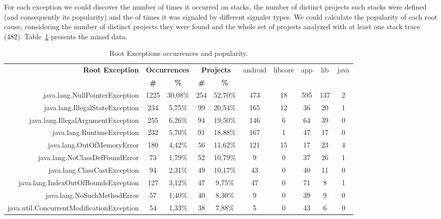 \documentclass[conference]{IEEEtran}
\begin{document}
For each exception we could discover the number of times it occurred on stacks,
the number of distinct projects such stacks were defined (and consequently its
popularity) and the of times it was signaled by different signaler types. We
could calculate the popularity of each root cause, considering the number of
distinct projects they were found and the whole set of projects analyzed with at
least one stack trace (482). Table~\ref{tab:toptenandroid} 
presents the mined data.

\begin{table}
  \centering
  \begin{tabular}{rccccccccc}
    \hline
    \bfseries{Root Exception} &  \multicolumn{2}{c}{\bfseries{Occurrences}} &  \multicolumn{2}{c}{\bfseries{Projects}} & \textsf{android} & \textsf{libcore} & \textsf{app} & \textsf{lib} & \textsf{java} \\
    & \bfseries{\#} &  \bfseries{\%} & \bfseries{\# } & \bfseries{\% } &&&&&\\
    \hline
java.lang.NullPointerException            & 1225 & 30,08\% & 254 & 52,70\% & 473 & 18 & 595 & 137 & 2 \\
java.lang.IllegalStateException           & 234  & 5,75\%  & 99  & 20,54\% & 165 & 12 & 36  & 20  & 1 \\
java.lang.IllegalArgumentException        & 255  & 6,26\%  & 94  & 19,50\% & 146 & 6  & 64  & 39  & 0 \\
java.lang.RuntimeException                & 232  & 5,70\%  & 91  & 18,88\% & 167 & 1  & 47  & 17  & 0 \\
java.lang.OutOfMemoryError                & 180  & 4,42\%  & 56  & 11,62\% & 121 & 15 & 17  & 23  & 4 \\
java.lang.NoClassDefFoundError            & 73   & 1,79\%  & 52  & 10,79\% & 9   & 0  & 37  & 26  & 1 \\
java.lang.ClassCastException              & 94   & 2,31\%  & 49  & 10,17\% & 43  & 0  & 40  & 11  & 0 \\
java.lang.IndexOutOfBoundsException       & 127  & 3,12\%  & 47  & 9,75\%  & 47  & 0  & 71  & 8   & 1 \\
java.lang.NoSuchMethodError               & 57   & 1,40\%  & 40  & 8,30\%  & 9   & 0  & 39  & 9   & 0 \\
java.util.ConcurrentModificationException & 54   & 1,33\%  & 38  & 7,88\%  & 5   & 0  & 43  & 6   & 0 \\

    \hline
  \end{tabular}
\caption{Root Exceptions occurrences and popularity.}
\label{tab:toptenandroid}
\end{table}
\end{document}

